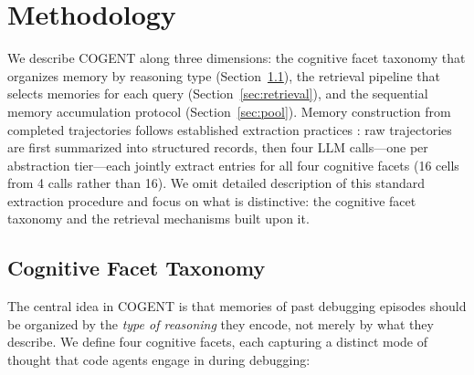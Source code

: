 \documentclass[letterpaper]{article} %
\begin{document}
\section{Methodology}

We describe \textsc{COGENT} along three dimensions: the cognitive facet taxonomy that organizes memory by reasoning type (Section~\ref{sec:taxonomy}), the retrieval pipeline that selects memories for each query (Section~\ref{sec:retrieval}), and the sequential memory accumulation protocol (Section~\ref{sec:pool}). Memory construction from completed trajectories follows established extraction practices \cite{expel, reflexion}: raw trajectories are first summarized into structured records, then four LLM calls---one per abstraction tier---each jointly extract entries for all four cognitive facets (16 cells from 4 calls rather than 16). We omit detailed description of this standard extraction procedure and focus on what is distinctive: the cognitive facet taxonomy and the retrieval mechanisms built upon it.

\subsection{Cognitive Facet Taxonomy}
\label{sec:taxonomy}

The central idea in \textsc{COGENT} is that memories of past debugging episodes should be organized by the \emph{type of reasoning} they encode, not merely by what they describe. We define four cognitive facets, each capturing a distinct mode of thought that code agents engage in during debugging:
\end{document}
